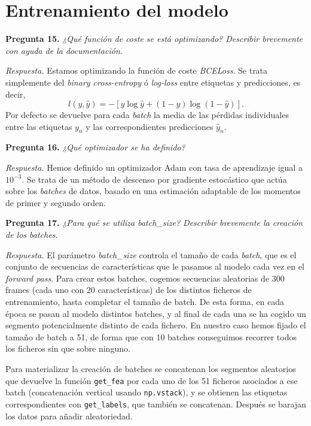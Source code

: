\documentclass[11pt]{article}
\begin{document}
\section{Entrenamiento del modelo}

\textbf{Pregunta 15.} \textit{¿Qué función de coste se está optimizando? Describir brevemente con ayuda de la documentación.}

\textit{Respuesta.} Estamos optimizando la función de coste \textit{BCELoss}. Se trata simplemente del \textit{binary cross-entropy} ó \textit{log-loss} entre etiquetas y predicciones, es decir,
\[
l(y, \hat y) = -\left[ y\log \hat y + (1-y)\log (1-\hat y)\right].
\]
Por defecto se devuelve para cada \textit{batch} la media de las pérdidas individuales entre las etiquetas $y_n$ y las correspondientes predicciones $\hat y_n$.

\textbf{Pregunta 16.} \textit{¿Qué optimizador se ha definido?}

\textit{Respuesta.} Hemos definido un optimizador Adam con tasa de aprendizaje igual a $10^{-3}$. Se trata de un método de descenso por gradiente estocástico que actúa sobre los \textit{batches} de datos, basado en una estimación adaptable de los momentos de primer y segundo orden.

\textbf{Pregunta 17.} \textit{¿Para qué se utiliza batch\_size? Describir brevemente la creación de los batches.}

\textit{Respuesta.} El parámetro \textit{batch\_size} controla el tamaño de cada \textit{batch}, que es el conjunto de secuencias de características que le pasamos al modelo cada vez en el \textit{forward pass}. Para crear estos batches, cogemos secuencias aleatorias de 300 frames (cada uno con 20 características) de los distintos ficheros de entrenamiento, hasta completar el tamaño de batch. De esta forma, en cada época se pasan al modelo distintos batches, y al final de cada una se ha cogido un segmento potencialmente distinto de cada fichero. En nuestro caso hemos fijado el tamaño de batch a 51, de forma que con 10 batches conseguimos recorrer todos los ficheros sin que sobre ninguno.

Para materializar la creación de batches se concatenan los segmentos aleatorios que devuelve la función \texttt{get\_fea} por cada uno de los 51 ficheros asociados a ese batch (concatenación vertical usando \texttt{np.vstack}), y se obtienen las etiquetas correspondientes con \texttt{get\_labels}, que también se concatenan. Después se barajan los datos para añadir aleatoriedad.
\end{document}
